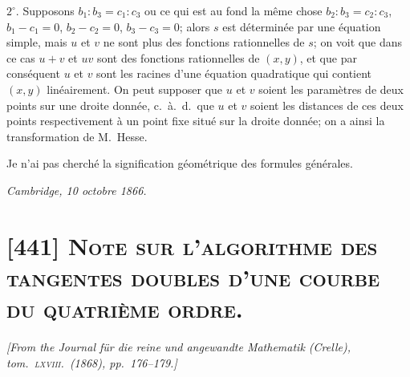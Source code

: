 \documentclass[11pt,a4paper]{article}
\begin{document}
$2^\circ$. Supposons $b_1 : b_3 = c_1 : c_3$ ou ce qui est au fond la m\^eme chose
$b_2 : b_3 = c_2 : c_3$, $b_1 - c_1 = 0$, $b_2 - c_2 = 0$, $b_3 - c_3 = 0$; alors $s$ est
d\'etermin\'ee par une \'equation simple, mais $u$ et $v$ ne sont plus des fonctions
rationnelles de $s$; on voit que dans ce cas $u + v$ et $uv$ sont des fonctions
rationnelles de $(x, y)$, et que par cons\'equent $u$ et $v$ sont les racines d'une
\'equation quadratique qui contient $(x, y)$ lin\'eairement. On peut supposer que $u$ et $v$
soient les param\`etres de deux points sur une droite donn\'ee, c.\ \`a.\ d.\ que $u$ et $v$
soient les distances de ces deux points respectivement \`a un point fixe situ\'e sur la
droite donn\'ee; on a ainsi la transformation de M.\ Hesse.

Je n'ai pas cherch\'e la signification g\'eom\'etrique des formules g\'en\'erales.

\begin{flushright}
\textit{Cambridge, 10 octobre 1866.}
\end{flushright}

\clearpage

\section{[441] \textsc{Note sur l'algorithme des tangentes doubles d'une courbe du quatri\`eme ordre.}}

\begin{center}
\textit{[From the Journal f\"ur die reine und angewandte Mathematik (Crelle), tom.\ \textsc{lxviii}.\ (1868), pp.\ 176--179.]}
\end{center}

\medskip
\end{document}
